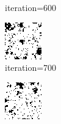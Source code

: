 \documentclass{article}
\begin{document}
\begin{figure}[h]
\begin{subfigure}[t]{0.18\textwidth}
\vspace{-0.6cm}
\caption{iteration=600}
\end{subfigure}\hspace{0.01\textwidth}
\begin{subfigure}[t]{0.18\textwidth}
\centering
\includegraphics[width=\textwidth]{./computational/results/gibbs_node_sampler_positive_iter_700.png}
\vspace{-0.6cm}
\caption{iteration=700}
\end{subfigure}\hspace{0.01\textwidth}
\begin{subfigure}[t]{0.18\textwidth}
\centering
\includegraphics[width=\textwidth]{./computational/results/gibbs_node_sampler_positive_iter_800.png}

\end{subfigure}
\end{figure}
\end{document}
